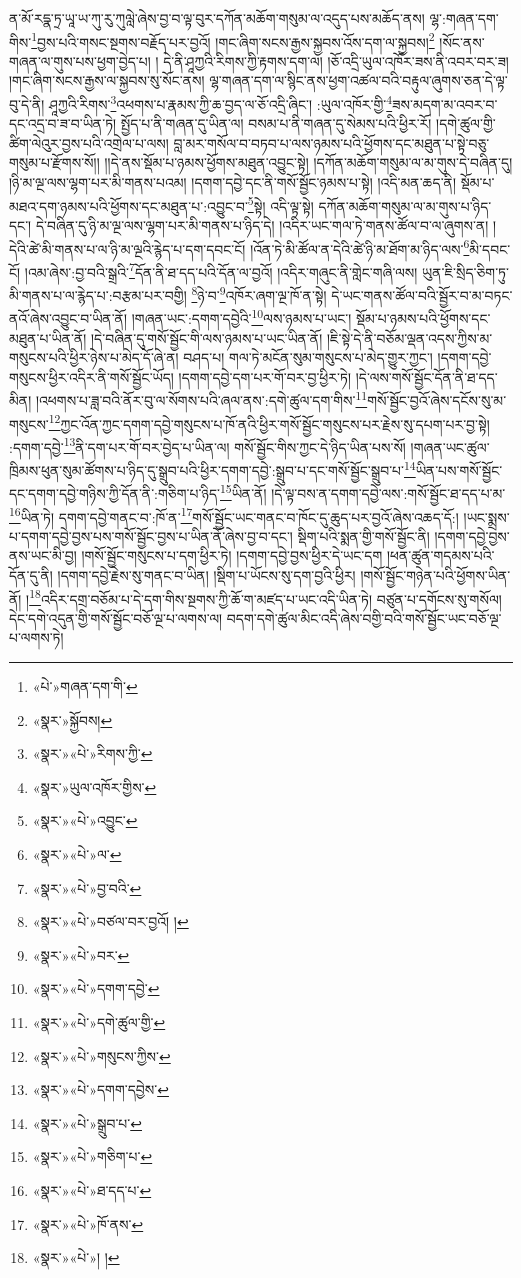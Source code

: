 ན་མོ་རདྣ་ཏྲ་ཡཱ་ཡ་ཀུ་རུ་ཀུལླེ་ཞེས་བྱ་བ་ལྟ་བུར་དཀོན་མཆོག་གསུམ་ལ་འདུད་པས་མཆོད་ནས། ལྷ་:གཞན་དག་གིས་\footnote{«པེ་»གཞན་དག་གི་}བྱས་པའི་གསང་སྔགས་བརྗོད་པར་བྱའོ། །གང་ཞིག་སངས་རྒྱས་སྐྱབས་འོས་དག་ལ་སྐྱབས།\footnote{«སྣར་»སྐྱོབས།} །སོང་ནས་གཞན་ལ་གུས་པས་ཕྱག་བྱེད་པ། །
དེ་ནི་ཤཱཀྱའི་རིགས་ཀྱི་རྟགས་དག་ལ། །ཅོ་འདྲི་ཡུལ་འཁོར་ཟས་ནི་འབར་བར་ཟ། །གང་ཞིག་སངས་རྒྱས་ལ་སྐྱབས་སུ་སོང་ནས། ལྷ་གཞན་དག་ལ་སྙིང་ནས་ཕྱག་འཚལ་བའི་བརྟུལ་ཞུགས་ཅན་དེ་ལྟ་བུ་དེ་ནི། ཤཱཀྱའི་རིགས་\footnote{«སྣར་»«པེ་»རིགས་ཀྱི་}འཕགས་པ་རྣམས་ཀྱི་ཆ་བྱད་ལ་ཅོ་འདྲི་ཞིང་། :ཡུལ་འཁོར་གྱི་\footnote{«སྣར་»ཡུལ་འཁོར་གྱིས་}ཟས་མདག་མ་འབར་བ་དང་འདྲ་བ་ཟ་བ་ཡིན་ཏེ། སྤྱོད་པ་ནི་གཞན་དུ་ཡིན་ལ། བསམ་པ་ནི་གཞན་དུ་སེམས་པའི་ཕྱིར་རོ། །དགེ་ཚུལ་གྱི་ཚིག་ལེའུར་བྱས་པའི་འགྲེལ་པ་ལས། བླ་མར་གསོལ་བ་བཏབ་པ་ལས་ཉམས་པའི་ཕྱོགས་དང་མཐུན་པ་སྟེ་བཅུ་གསུམ་པ་རྫོགས་སོ།། །།དེ་ནས་སྡོམ་པ་ཉམས་ཕྱོགས་མཐུན་འབྱུང་སྟེ། །དཀོན་མཆོག་གསུམ་ལ་མ་གུས་དེ་བཞིན་དུ། །ཉི་མ་ལྔ་ལས་ལྷག་པར་མི་གནས་པའམ། །དགག་དབྱེ་དང་ནི་གསོ་སྦྱོང་ཉམས་པ་སྟེ། །འདི་མན་ཆད་ནི། སྡོམ་པ་མཐའ་དག་ཉམས་པའི་ཕྱོགས་དང་མཐུན་པ་:འབྱུང་བ་\footnote{«སྣར་»«པེ་»འབྱུང་}སྟེ། འདི་ལྟ་སྟེ། དཀོན་མཆོག་གསུམ་ལ་མ་གུས་པ་ཉིད་དང་། དེ་བཞིན་དུ་ཉི་མ་ལྔ་ལས་ལྷག་པར་མི་གནས་པ་ཉིད་དེ། །འདིར་ཡང་གལ་ཏེ་གནས་ཚོལ་བ་ལ་ཞུགས་ན། །དེའི་ཚེ་མི་གནས་པ་ལ་ཉི་མ་ལྔའི་རྙེད་པ་དག་དབང་ངོ། །འོན་ཏེ་མི་ཚོལ་ན་དེའི་ཚེ་ཉི་མ་ཐོག་མ་ཉིད་ལས་\footnote{«སྣར་»«པེ་»ལ་}མི་དབང་ངོ། །འམ་ཞེས་:བྱ་བའི་སྒྲའི་\footnote{«སྣར་»«པེ་»བྱ་བའི་}དོན་ནི་ཐ་དད་པའི་དོན་ལ་བྱའོ། །འདིར་གཞུང་ནི་གླེང་གཞི་ལས། ཡུན་ཇི་སྲིད་ཅིག་ཏུ་མི་གནས་པ་ལ་རྙེད་པ་:བརྩམ་པར་བགྱི། \footnote{«སྣར་»«པེ་»བཙལ་བར་བྱའོ། །}ཉེ་བ་\footnote{«སྣར་»«པེ་»བར་}འཁོར་ཞག་ལྔ་ཁོ་ན་སྟེ། དེ་ཡང་གནས་ཚོལ་བའི་སྦྱོར་བ་མ་བཏང་ནའོ་ཞེས་འབྱུང་བ་ཡིན་ནོ། །གཞན་ཡང་:དགག་དབྱེའི་\footnote{«སྣར་»«པེ་»དགག་དབྱེ་}ལས་ཉམས་པ་ཡང་། སྡོམ་པ་ཉམས་པའི་ཕྱོགས་དང་མཐུན་པ་ཡིན་ནོ། །དེ་བཞིན་དུ་གསོ་སྦྱོང་གི་ལས་ཉམས་པ་ཡང་ཡིན་ནོ། །ཇི་སྟེ་དེ་ནི་བཅོམ་ལྡན་འདས་ཀྱིས་མ་གསུངས་པའི་ཕྱིར་ཉེས་པ་མེད་དོ་ཞེ་ན། བཤད་པ། གལ་ཏེ་མངོན་སུམ་གསུངས་པ་མེད་གྱུར་ཀྱང་། །དགག་དབྱེ་གསུངས་ཕྱིར་འདིར་ནི་གསོ་སྦྱོང་ཡོད། །དགག་དབྱེ་དག་པར་གོ་བར་བྱ་ཕྱིར་ཏེ། །དེ་ལས་གསོ་སྦྱོང་དོན་ནི་ཐ་དད་མིན། །འཕགས་པ་ཟླ་བའི་ནོར་བུ་ལ་སོགས་པའི་ཞལ་ནས་:དགེ་ཚུལ་དག་གིས་\footnote{«སྣར་»«པེ་»དགེ་ཚུལ་གྱི་}གསོ་སྦྱོང་བྱའོ་ཞེས་དངོས་སུ་མ་གསུངས་\footnote{«སྣར་»«པེ་»གསུངས་ཀྱིས་}ཀྱང་འོན་ཀྱང་དགག་དབྱེ་གསུངས་པ་ཁོ་ནའི་ཕྱིར་གསོ་སྦྱོང་གསུངས་པར་རྗེས་སུ་དཔག་པར་བྱ་སྟེ། :དགག་དབྱེ་\footnote{«སྣར་»«པེ་»དགག་དབྱེས་}ནི་དག་པར་གོ་བར་བྱེད་པ་ཡིན་ལ། གསོ་སྦྱོང་གིས་ཀྱང་དེ་ཉིད་ཡིན་པས་སོ། །གཞན་ཡང་ཚུལ་ཁྲིམས་ཕུན་སུམ་ཚོགས་པ་ཉིད་དུ་སྒྲུབ་པའི་ཕྱིར་དགག་དབྱེ་:སྒྲུབ་པ་དང་གསོ་སྦྱོང་སྒྲུབ་པ་\footnote{«སྣར་»«པེ་»སྒྲུབ་པ་}ཡིན་པས་གསོ་སྦྱོང་དང་དགག་དབྱེ་གཉིས་ཀྱི་དོན་ནི་:གཅིག་པ་ཉིད་\footnote{«སྣར་»«པེ་»གཅིག་པ་}ཡིན་ནོ། །དེ་ལྟ་བས་ན་དགག་དབྱེ་ལས་:གསོ་སྦྱོང་ཐ་དད་པ་མ་\footnote{«སྣར་»«པེ་»ཐ་དད་པ་}ཡིན་ཏེ། དགག་དབྱེ་གནང་བ་:ཁོ་ན་\footnote{«སྣར་»«པེ་»ཁོ་ནས་}གསོ་སྦྱོང་ཡང་གནང་བ་ཁོང་དུ་ཆུད་པར་བྱའོ་ཞེས་འཆད་དོ:། །ཡང་སྨྲས་པ་དགག་དབྱེ་བྱས་པས་གསོ་སྦྱོང་བྱས་པ་ཡིན་ནོ་ཞེས་བྱ་བ་དང་། སྡིག་པའི་སྨན་གྱི་གསོ་སྦྱོང་ནི། །དགག་དབྱེ་བྱས་ནས་ཡང་མི་བྱ། །གསོ་སྦྱོང་གསུངས་པ་དག་ཕྱིར་ཏེ། །དགག་དབྱེ་བྱས་ཕྱིར་དེ་ཡང་དག །ཕན་ཚུན་གདམས་པའི་དོན་དུ་ནི། །དགག་དབྱེ་རྗེས་སུ་གནང་བ་ཡིན། །སྡིག་པ་ཡོངས་སུ་དག་བྱའི་ཕྱིར། །གསོ་སྦྱོང་གཉེན་པའི་ཕྱོགས་ཡིན་ནོ། །\footnote{«སྣར་»«པེ་»། །}འདིར་དགྲ་བཅོམ་པ་དེ་དག་གིས་སྔགས་ཀྱི་ཆོ་ག་མཛད་པ་ཡང་འདི་ཡིན་ཏེ། བཙུན་པ་དགོངས་སུ་གསོལ། དེང་དགེ་འདུན་གྱི་གསོ་སྦྱོང་བཅོ་ལྔ་པ་ལགས་ལ། བདག་དགེ་ཚུལ་མིང་འདི་ཞེས་བགྱི་བའི་གསོ་སྦྱོང་ཡང་བཅོ་ལྔ་པ་ལགས་ཏེ། 